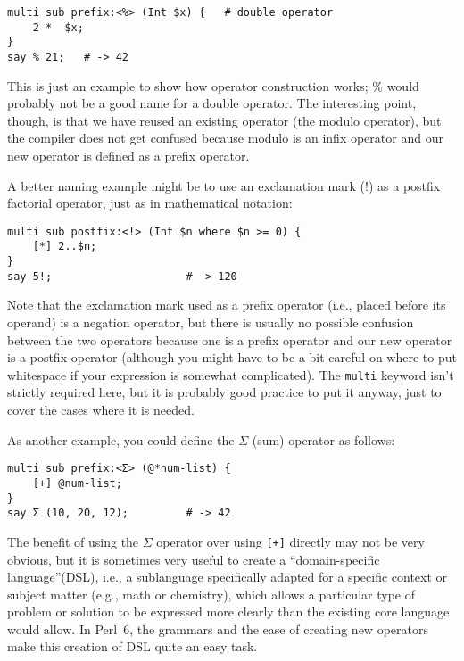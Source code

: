 \begin{verbatim}
multi sub prefix:<%> (Int $x) {   # double operator
    2 *  $x;
}
say % 21;   # -> 42
\end{verbatim}

This is just an example to show how operator construction works; \% would 
probably not be a good name for a double operator. The 
interesting point, though, is that we have reused an existing 
operator (the modulo operator), but the compiler does not 
get confused because modulo is an infix operator and our 
new operator is defined as a prefix operator.

A better naming example might be to use an exclamation 
mark (!) as a postfix factorial operator, just as in 
mathematical notation:

\begin{verbatim}
multi sub postfix:<!> (Int $n where $n >= 0) {
    [*] 2..$n;
}
say 5!;                     # -> 120
\end{verbatim}

Note that the exclamation mark used as a prefix 
operator (i.e., placed before its operand) is 
a negation operator, but there is usually no possible 
confusion between the two operators because one is a 
prefix operator and our new operator is a postfix operator 
(although you might have to be a bit careful on where 
to put whitespace if your expression is somewhat 
complicated). The {\tt multi} keyword isn't strictly 
required here, but it is probably good practice to 
put it anyway, just to cover the cases where it is 
needed. 

As another example, you could define the $\Sigma$ (sum) 
operator as follows:

\begin{verbatim}
multi sub prefix:<Σ> (@*num-list) {
    [+] @num-list;
}
say Σ (10, 20, 12);         # -> 42
\end{verbatim}

The benefit of using the $\Sigma$ operator over using 
\verb'[+]' directly may not be very obvious, but it is 
sometimes very useful to create a ``domain-specific 
language''(DSL), i.e., a sublanguage specifically 
adapted for a specific context or subject matter (e.g., math 
or chemistry), which allows a particular type of problem 
or solution to be expressed more clearly than the 
existing core language would allow. In Perl~6, the 
grammars and the ease of creating new operators make 
this creation of DSL quite an easy task.


